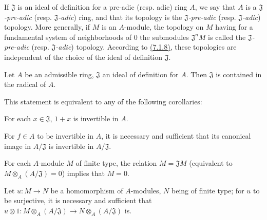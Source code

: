 If $\mathfrak{J}$ is an ideal of definition for a pre-adic (resp. adic) ring
$A$, we say that $A$ is a {\em $\mathfrak{J}$-pre-adic}
(resp. {\em $\mathfrak{J}$-adic}) ring, and that its topology is the
{\em $\mathfrak{J}$-pre-adic} (resp. {\em $\mathfrak{J}$-adic}) topology. More
generally, if $M$ is an $A$-module, the topology on $M$ having for a fundamental
system of neighborhoods of $0$ the submodules $\mathfrak{J}^n M$ is called the
{\em $\mathfrak{J}$-pre-adic} (resp. {\em $\mathfrak{J}$-adic}) topology.
According to \hyperref[0.7.1.8]{(7.1.8)}, these topologies are independent of the choice
of the ideal of definition $\mathfrak{J}$.

\begin{prop}[7.1.10]
\label{0.7.1.10}
Let $A$ be an admissible ring, $\mathfrak{J}$ an ideal of definition for $A$.
Then $\mathfrak{J}$ is contained in the radical of $A$.
\end{prop}

This statement is equivalent to any of the following corollaries:
\begin{cor}[7.1.11]
\label{0.7.1.11}
For each $x\in\mathfrak{J}$, $1+x$ is invertible in $A$.
\end{cor}

\begin{cor}[7.1.12]
\label{0.7.1.12}
For $f\in A$ to be invertible in $A$, it is necessary and sufficient that its
canonical image in $A/\mathfrak{J}$ is invertible in $A/\mathfrak{J}$.
\end{cor}

\begin{cor}[7.1.13]
\label{0.7.1.13}
For each $A$-module $M$ of finite type, the relation $M=\mathfrak{J}M$
(equivalent to $M\otimes_A(A/\mathfrak{J})=0$) implies that $M=0$.
\end{cor}

\begin{cor}[7.1.14]
\label{0.7.1.14}
Let $u:M\to N$ be a homomorphism of $A$-modules, $N$ being of finite type; for
$u$ to be surjective, it is necessary and sufficient that
$u\otimes 1:M\otimes_A(A/\mathfrak{J})\to N\otimes_A(A/\mathfrak{J})$ is.
\end{cor}

